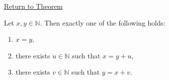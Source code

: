 \newpage
{}
\label{prf:trichotomy-for-natural-numbers}

\begin{remark*}[Return]
\hyperref[thm:trichotomy-for-natural-numbers]{Return to Theorem}
\end{remark*}

\begin{theorem*}
Let \(x,y\in\mathbb{N}\). Then exactly one of the following holds:
\begin{enumerate}[label=(\arabic*)]
\item \(x=y\),
\item there exists \(u\in\mathbb{N}\) such that \(x=y+u\),
\item there exists \(v\in\mathbb{N}\) such that \(y=x+v\).
\end{enumerate}
\end{theorem*}

